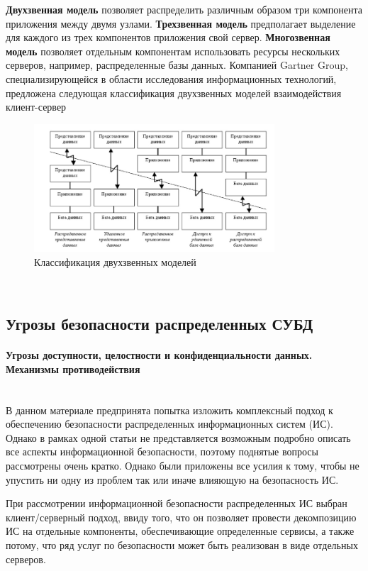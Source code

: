 \textbf{Двухзвенная модель} позволяет распределить различным образом три компонента приложения между двумя узлами.
\textbf{Трехзвенная модель} предполагает выделение для каждого из трех компонентов приложения свой сервер.
\textbf{Многозвенная модель} позволяет отдельным компонентам использовать ресурсы нескольких серверов, например,
распределенные базы данных. Компанией Gartner Group, специализирующейся в области исследования информационных технологий,
предложена следующая классификация двухзвенных моделей взаимодействия клиент-сервер \autocite{dce}
\begin{figure}[h!]
    \centering
    \includegraphics[width=0.8\textwidth]{assets/dce.jpg}
    \caption{Классификация двухзвенных моделей}
\end{figure}
\\

\subsection{Угрозы безопасности распределенных СУБД}
\paragraph{Угрозы доступности, целостности и конфиденциальности данных. Механизмы противодействия} ~\\

В данном материале \autocite{infosec} предпринята попытка изложить комплексный подход к обеспечению безопасности
распределенных информационных систем (ИС).
Однако в рамках одной статьи не представляется возможным подробно описать все аспекты информационной безопасности,
поэтому поднятые вопросы рассмотрены очень кратко. Однако были приложены все усилия к тому,
чтобы не упустить ни одну из проблем так или иначе влияющую на безопасность ИС.

При рассмотрении информационной безопасности распределенных ИС выбран клиент/серверный подход, ввиду того,
что он позволяет провести декомпозицию ИС на отдельные компоненты, обеспечивающие определенные сервисы,
а также потому, что ряд услуг по безопасности может быть реализован в виде отдельных серверов.

